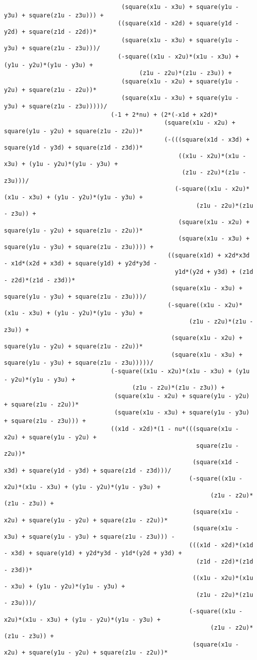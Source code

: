 \begin{lstlisting}
								 (square(x1u - x3u) + square(y1u - y3u) + square(z1u - z3u))) + 
								((square(x1d - x2d) + square(y1d - y2d) + square(z1d - z2d))*
								 (square(x1u - x3u) + square(y1u - y3u) + square(z1u - z3u)))/
								(-square((x1u - x2u)*(x1u - x3u) + (y1u - y2u)*(y1u - y3u) + 
									  (z1u - z2u)*(z1u - z3u)) + 
								 (square(x1u - x2u) + square(y1u - y2u) + square(z1u - z2u))*
								 (square(x1u - x3u) + square(y1u - y3u) + square(z1u - z3u)))))/
							  (-1 + 2*nu) + (2*(-x1d + x2d)*
											 (square(x1u - x2u) + square(y1u - y2u) + square(z1u - z2u))*
											 (-(((square(x1d - x3d) + square(y1d - y3d) + square(z1d - z3d))*
												 ((x1u - x2u)*(x1u - x3u) + (y1u - y2u)*(y1u - y3u) + 
												  (z1u - z2u)*(z1u - z3u)))/
												(-square((x1u - x2u)*(x1u - x3u) + (y1u - y2u)*(y1u - y3u) + 
													  (z1u - z2u)*(z1u - z3u)) + 
												 (square(x1u - x2u) + square(y1u - y2u) + square(z1u - z2u))*
												 (square(x1u - x3u) + square(y1u - y3u) + square(z1u - z3u)))) + 
											  ((square(x1d) + x2d*x3d - x1d*(x2d + x3d) + square(y1d) + y2d*y3d - 
												y1d*(y2d + y3d) + (z1d - z2d)*(z1d - z3d))*
											   (square(x1u - x3u) + square(y1u - y3u) + square(z1u - z3u)))/
											  (-square((x1u - x2u)*(x1u - x3u) + (y1u - y2u)*(y1u - y3u) + 
													(z1u - z2u)*(z1u - z3u)) + 
											   (square(x1u - x2u) + square(y1u - y2u) + square(z1u - z2u))*
											   (square(x1u - x3u) + square(y1u - y3u) + square(z1u - z3u)))))/
							  (-square((x1u - x2u)*(x1u - x3u) + (y1u - y2u)*(y1u - y3u) + 
									(z1u - z2u)*(z1u - z3u)) + 
							   (square(x1u - x2u) + square(y1u - y2u) + square(z1u - z2u))*
							   (square(x1u - x3u) + square(y1u - y3u) + square(z1u - z3u))) + 
							  ((x1d - x2d)*(1 - nu*(((square(x1u - x2u) + square(y1u - y2u) + 
													  square(z1u - z2u))*
													 (square(x1d - x3d) + square(y1d - y3d) + square(z1d - z3d)))/
													(-square((x1u - x2u)*(x1u - x3u) + (y1u - y2u)*(y1u - y3u) + 
														  (z1u - z2u)*(z1u - z3u)) + 
													 (square(x1u - x2u) + square(y1u - y2u) + square(z1u - z2u))*
													 (square(x1u - x3u) + square(y1u - y3u) + square(z1u - z3u))) - 
													(((x1d - x2d)*(x1d - x3d) + square(y1d) + y2d*y3d - y1d*(y2d + y3d) + 
													  (z1d - z2d)*(z1d - z3d))*
													 ((x1u - x2u)*(x1u - x3u) + (y1u - y2u)*(y1u - y3u) + 
													  (z1u - z2u)*(z1u - z3u)))/
													(-square((x1u - x2u)*(x1u - x3u) + (y1u - y2u)*(y1u - y3u) + 
														  (z1u - z2u)*(z1u - z3u)) + 
													 (square(x1u - x2u) + square(y1u - y2u) + square(z1u - z2u))*

\end{lstlisting}
